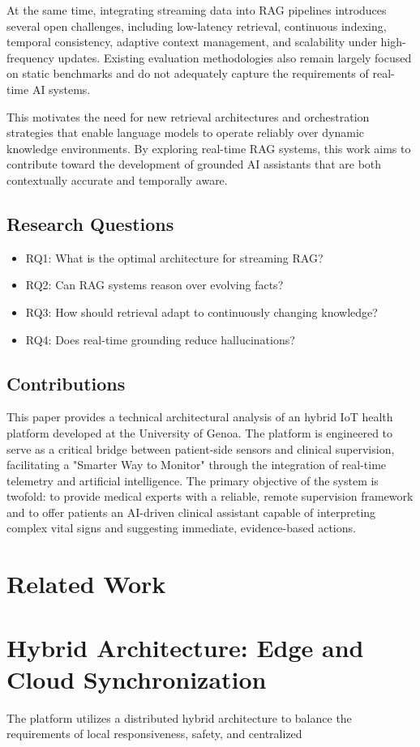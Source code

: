 \documentclass[runningheads]{llncs}
\begin{document}
At the same time, integrating streaming data into RAG pipelines introduces several open challenges, including low-latency retrieval, continuous indexing, temporal consistency, adaptive context management, and scalability under high-frequency updates. Existing evaluation methodologies also remain largely focused on static benchmarks and do not adequately capture the requirements of real-time AI systems.

This motivates the need for new retrieval architectures and orchestration strategies that enable language models to operate reliably over dynamic knowledge environments. By exploring real-time RAG systems, this work aims to contribute toward the development of grounded AI assistants that are both contextually accurate and temporally aware.
\subsection{Research Questions}
\begin{itemize}
\item RQ1: What is the optimal architecture for streaming RAG?
\item RQ2: Can RAG systems reason over evolving facts?
\item RQ3: How should retrieval adapt to continuously changing knowledge?
\item RQ4: Does real-time grounding reduce hallucinations?
\end{itemize}
\subsection{Contributions}
This paper provides a technical architectural analysis of an hybrid IoT health platform developed at the University of Genoa.
The platform is engineered to serve as a critical bridge between patient-side sensors and clinical supervision, facilitating a "Smarter Way to Monitor" through the integration of real-time telemetry and artificial intelligence.
The primary objective of the system is twofold: to provide medical experts with a reliable, remote supervision framework and to offer patients an AI-driven clinical assistant capable of interpreting complex vital signs and suggesting immediate, evidence-based actions.

\section{Related Work}

\section{Hybrid Architecture: Edge and Cloud Synchronization}
The platform utilizes a distributed hybrid architecture to balance the requirements of local responsiveness, safety, and centralized 
\end{document}

